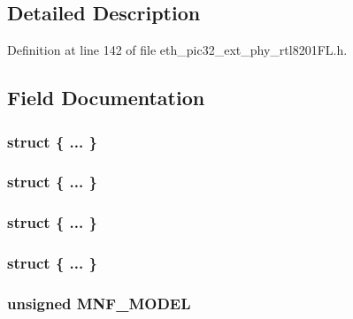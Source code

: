 \subsection{Detailed Description}


Definition at line 142 of file eth\+\_\+pic32\+\_\+ext\+\_\+phy\+\_\+rtl8201\+F\+L.\+h.



\subsection{Field Documentation}
\hypertarget{union_____p_h_y_i_d2bits__t_ab3e269cb9fdc1277525667cefc48ef0b}{}\subsubsection[{"@112}]{\setlength{\rightskip}{0pt plus 5cm}struct \{ ... \} }\label{union_____p_h_y_i_d2bits__t_ab3e269cb9fdc1277525667cefc48ef0b}
\hypertarget{union_____p_h_y_i_d2bits__t_afa67a030b5d75640806b5f8e56958463}{}\subsubsection[{"@114}]{\setlength{\rightskip}{0pt plus 5cm}struct \{ ... \} }\label{union_____p_h_y_i_d2bits__t_afa67a030b5d75640806b5f8e56958463}
\hypertarget{union_____p_h_y_i_d2bits__t_abde53f3877e080ca0c37c65fd0e720b0}{}\subsubsection[{"@184}]{\setlength{\rightskip}{0pt plus 5cm}struct \{ ... \} }\label{union_____p_h_y_i_d2bits__t_abde53f3877e080ca0c37c65fd0e720b0}
\hypertarget{union_____p_h_y_i_d2bits__t_ac13111d1d5bd4b625836570aadb92ec3}{}\subsubsection[{"@186}]{\setlength{\rightskip}{0pt plus 5cm}struct \{ ... \} }\label{union_____p_h_y_i_d2bits__t_ac13111d1d5bd4b625836570aadb92ec3}
\hypertarget{union_____p_h_y_i_d2bits__t_afdf9c4b774c086b088160fb5c6b27ece}{}
\subsubsection[{M\+N\+F\+\_\+\+M\+O\+D\+E\+L}]{\setlength{\rightskip}{0pt plus 5cm}unsigned M\+N\+F\+\_\+\+M\+O\+D\+E\+L}\label{union_____p_h_y_i_d2bits__t_afdf9c4b774c086b088160fb5c6b27ece}


